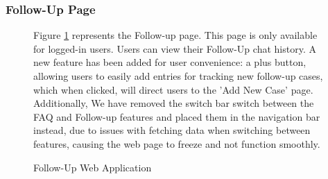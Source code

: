 \documentclass[12pt,oneside,openright,a4paper]{cpe-english-project}
\begin{document}
        \subsubsection{Follow-Up Page}
          \begin{figure}[H]
            \centering
            \caption{Follow-Up Web Application}\label{fig:WebAppFollowUp}
            \begin{justify}
              \qquad Figure \ref{fig:WebAppFollowUp} represents the Follow-up page. This page is only available for logged-in users. Users can view their Follow-Up chat history. A new feature has been added for user convenience: a plus button, allowing users to easily add entries for tracking new follow-up cases, which when clicked, will direct users to the 'Add New Case' page. Additionally, We have removed the switch bar switch between  the FAQ and Follow-up features and placed them in the navigation bar instead, due to issues with fetching data when switching between features, causing the web page to freeze and not function smoothly.\par
            \end{justify}        
          \end{figure}
\end{document}
